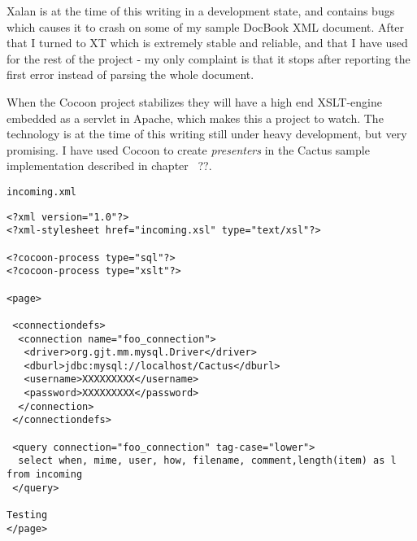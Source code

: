 Xalan is at the time of this writing in a development state, and
contains bugs which causes it to crash on some of my sample DocBook
XML document.  After that I turned to XT which is extremely stable and
reliable, and that I have used for the rest of the project - my only
complaint is that it stops after reporting the first error instead of
parsing the whole document.


When the Cocoon project stabilizes they will have a
high end XSLT-engine embedded as a servlet in Apache, which makes this
a project to watch.  The technology is at the time of this writing
still under heavy development, but very promising.  I have used Cocoon
to create \textit{presenters} in the Cactus sample implementation
described in chapter~ \textsf{??}.



\textsf{\texttt{incoming.xml}}
\begin{verbatim}
<?xml version="1.0"?>
<?xml-stylesheet href="incoming.xsl" type="text/xsl"?>

<?cocoon-process type="sql"?>
<?cocoon-process type="xslt"?>

<page>

 <connectiondefs>
  <connection name="foo_connection">
   <driver>org.gjt.mm.mysql.Driver</driver>
   <dburl>jdbc:mysql://localhost/Cactus</dburl>
   <username>XXXXXXXXX</username>
   <password>XXXXXXXXX</password>
  </connection>
 </connectiondefs> 
 
 <query connection="foo_connection" tag-case="lower">
  select when, mime, user, how, filename, comment,length(item) as l  from incoming
 </query>

Testing 
</page>
\end{verbatim}


